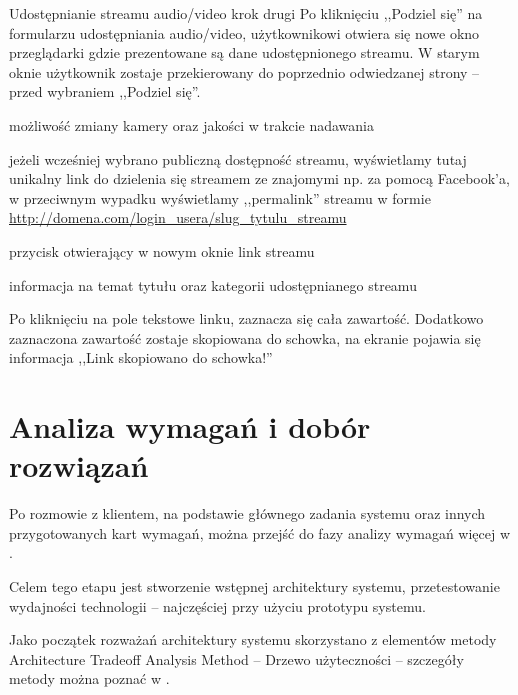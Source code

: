 \begin{userstory}{Udostępnianie streamu audio/video krok drugi}
    Po kliknięciu ,,Podziel się'' na formularzu udostępniania audio/video, użytkownikowi otwiera się nowe okno przeglądarki gdzie prezentowane są dane udostępnionego streamu. W starym oknie użytkownik zostaje przekierowany do poprzednio odwiedzanej strony -- przed wybraniem ,,Podziel się''.
    \begin{packed_enum}
        \item{możliwość zmiany kamery oraz jakości w trakcie nadawania}
        \item{jeżeli wcześniej wybrano publiczną dostępność streamu, wyświetlamy tutaj unikalny link do dzielenia się streamem ze znajomymi np. za pomocą Facebook'a, w przeciwnym wypadku wyświetlamy ,,permalink'' streamu w formie \url{http://domena.com/login_usera/slug_tytulu_streamu}}
        \item{przycisk otwierający w nowym oknie link streamu}
        \item{informacja na temat tytułu oraz kategorii udostępnianego streamu}
    \end{packed_enum}
    \begin{tests}
        \item{Po kliknięciu na pole tekstowe linku, zaznacza się cała zawartość. Dodatkowo zaznaczona zawartość zostaje skopiowana do schowka, na ekranie pojawia się informacja ,,Link skopiowano do schowka!''}
    \end{tests}
\end{userstory}

\section{Analiza wymagań i dobór rozwiązań}
\label{sec:EtapIaw}

Po rozmowie z klientem, na podstawie głównego zadania systemu oraz innych przygotowanych kart wymagań, można przejść do fazy analizy wymagań więcej w .

Celem tego etapu jest stworzenie wstępnej architektury systemu, przetestowanie wydajności technologii -- najczęściej przy użyciu prototypu systemu.

Jako początek rozważań architektury systemu skorzystano z elementów metody Architecture Tradeoff Analysis Method -- Drzewo użyteczności -- szczegóły metody można poznać w \cite{Kaz2000}.

